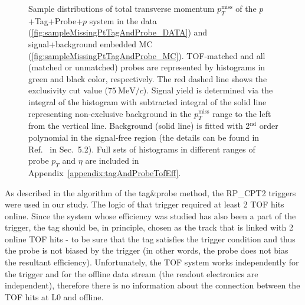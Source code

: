 \begin{figure}[h]
{\begin{subfigure}[b]{\linewidth}
  \end{subfigure}
}\vspace{-5pt}%
\caption[Sample distributions of $p_{T}^{\text{miss}}$ of the $p$+Tag+Probe+$p$ system in the data and embedded MC.]%
    {Sample distributions of total transverse momentum $p_{T}^{\text{miss}}$ of the $p$+Tag+Probe+$p$ system in the data (\ref{fig:sampleMissingPtTagAndProbe_DATA}) and signal+background embedded MC (\ref{fig:sampleMissingPtTagAndProbe_MC}). TOF-matched and all (matched or unmatched) probes are represented by histograms in green and black color, respectively. The red dashed line shows the exclusivity cut value ($75~\text{MeV}/c$). Signal yield is determined via the integral of the histogram with subtracted integral of the solid line representing non-exclusive background in the $p_{T}^{\text{miss}}$ range to the left from the vertical line. Background (solid line) is fitted with 2$^{\text{nd}}$ order polynomial in the signal-free region (the details can be found in Ref.~\cite{AnalysisNoteRafal} in Sec.~5.2). Full sets of histograms in different ranges of probe $p_{T}$ and $\eta$ are included in Appendix~\ref{appendix:tagAndProbeTofEff}.}\label{fig:sampleMissingPtTagAndProbe}%
\end{figure}
\newpage%
%
As described in the algorithm of the tag\&probe method, the RP\_CPT2 triggers were used in our study. The logic of that trigger required at least 2 TOF hits online. Since the system whose efficiency was studied has also been a part of the trigger, the tag should be, in principle, chosen as the track that is linked with 2 online TOF hits - to be sure that the tag satisfies the trigger condition and thus the probe is not biased by the trigger (in other words, the probe does not bias the resultant efficiency). Unfortunately, the TOF system works independently for the trigger and for the offline data stream (the readout electronics are independent), therefore there is no information about the connection between the TOF hits at L0 and offline.
 
